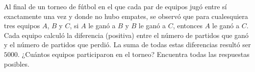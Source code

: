 Al final de un torneo de fútbol en el que cada par de equipos jugó entre sí exactamente una vez y donde no hubo empates, se observó que para cualesquiera tres equipos $A$, $B$ y $C$, si $A$ le ganó a $B$ y $B$ le ganó a $C$, entonces $A$ le ganó a $C$. 
Cada equipo calculó la diferencia (positiva) entre el número de partidos que ganó y el número de partidos que perdió. La suma de todas estas diferencias resultó ser $5000$. ¿Cuántos equipos participaron en el torneo? Encuentra todas las respuestas posibles.